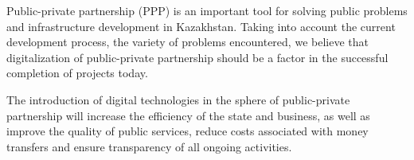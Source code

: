 
\begin{multicols}{2}
Public-private partnership (PPP) is an important tool for solving public
problems and infrastructure development in Kazakhstan. Taking into
account the current development process, the variety of problems
encountered, we believe that digitalization of public-private
partnership should be a factor in the successful completion of projects
today.

The introduction of digital technologies in the sphere of public-private
partnership will increase the efficiency of the state and business, as
well as improve the quality of public services, reduce costs associated
with money transfers and ensure transparency of all ongoing activities.
\end{multicols}

